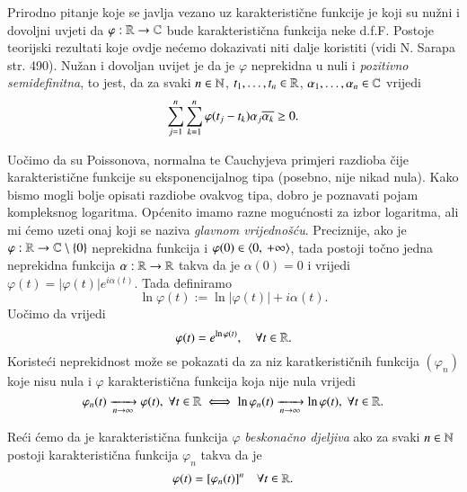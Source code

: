 \begin{nap} \label{nap:17.17}
    Prirodno pitanje koje se javlja vezano uz karakteristi\v cne funkcije je koji su nu\v zni i dovoljni uvjeti da $\varphi : \mathbb{R} \to \mathbb{C}$ bude karakteristi\v cna funkcija neke d.f.F.
    Postoje teorijski rezultati koje ovdje ne\' cemo dokazivati niti dalje koristiti (vidi N. Sarapa str. 490).
    Nu\v zan i dovoljan uvijet je da je $\varphi$ neprekidna u nuli i \emph{pozitivno semidefinitna}, to jest, da za svaki $n \in \mathbb{N}$, $t_1, \ldots, t_n \in \mathbb{R}$, $\alpha_1, \ldots, \alpha_n \in \mathbb{C}$ vrijedi
    \begin{equation}    \label{jed:17.18}
        \sum\limits_{j = 1}^{n} \sum\limits_{k = 1}^{n} \varphi(t_j - t_k) \alpha_j \overline{\alpha_k} \geq 0.
    \end{equation} 
\end{nap}

Uo\v cimo da su Poissonova, normalna te Cauchyjeva primjeri razdioba \v cije karakteristi\v cne funkcije su eksponencijalnog tipa (posebno, nije nikad nula).
Kako bismo mogli bolje opisati razdiobe ovakvog tipa, dobro je poznavati pojam kompleksnog logaritma.
Op\' cenito imamo razne mogu\' cnosti za izbor logaritma, ali mi \' cemo uzeti onaj koji se naziva \emph{glavnom vrijedno\v s\' cu}.
Preciznije, ako je $\varphi : \mathbb{R} \to \mathbb{C} \setminus \{0\}$ neprekidna funkcija i $\varphi (0) \in \langle {0}, \: {+ \infty} \rangle$, tada postoji to\v cno jedna neprekidna funkcija $\alpha : \mathbb{R} \to \mathbb{R}$ takva da je $\alpha (0) = 0$ i vrijedi $\varphi (t) = | \varphi (t) | e^{i \alpha (t)}$.
Tada definiramo
\begin{equation}    \label{jed:17.19}
    \ln \varphi (t) := \ln | \varphi (t) | + i \alpha (t).
\end{equation}
Uo\v cimo da vrijedi
\begin{equation}    \label{jed:17.20}
    \varphi (t) = e^{\ln \varphi (t)}, \quad \forall t \in \mathbb{R}.
\end{equation}
Koriste\' ci neprekidnost mo\v ze se pokazati da za niz karatkeristi\v cnih funkcija $(\varphi_n)$ koje nisu nula i $\varphi$ karakteristi\v cna funkcija koja nije nula vrijedi
\begin{equation}    \label{jed:17.21}
    \varphi_n (t) \xrightarrow[n \to \infty]{} \varphi (t), \; \forall t \in \mathbb{R} \iff \ln \varphi_n (t) \xrightarrow[n \to \infty]{} \ln \varphi (t), \; \forall t \in \mathbb{R}.
\end{equation}

\begin{defn}    \label{defn:17.22}
    Re\' ci \' cemo da je karakteristi\v cna funkcija $\varphi$ \emph{beskona\v cno djeljiva} ako za svaki $n \in \mathbb{N}$ postoji karakteristi\v cna funkcija $\varphi_n$ takva da je
    \begin{equation*}
        \varphi (t) = [\varphi_n (t)]^n \quad \forall t \in \mathbb{R}.
    \end{equation*}
\end{defn}

